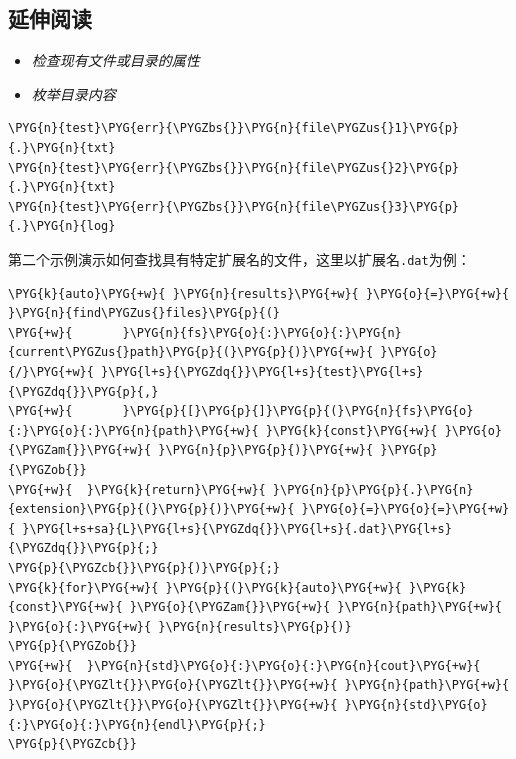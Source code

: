 
\subsection{延伸阅读}



\begin{itemize}
\item \textit{检查现有文件或目录的属性}



\item \textit{枚举目录内容}

\end{itemize}


\begin{codeblockbg}
\begin{Verbatim}[commandchars=\\\{\},breaklines=true,breakanywhere=true,fontsize=\codefont,xleftmargin=17bp]
\PYG{n}{test}\PYG{err}{\PYGZbs{}}\PYG{n}{file\PYGZus{}1}\PYG{p}{.}\PYG{n}{txt}
\PYG{n}{test}\PYG{err}{\PYGZbs{}}\PYG{n}{file\PYGZus{}2}\PYG{p}{.}\PYG{n}{txt}
\PYG{n}{test}\PYG{err}{\PYGZbs{}}\PYG{n}{file\PYGZus{}3}\PYG{p}{.}\PYG{n}{log}
\end{Verbatim}
\end{codeblockbg}



第二个示例演示如何查找具有特定扩展名的文件，这里以扩展名\texttt{.\allowbreak{}dat}为例：



\begin{codeblockbg}
\begin{Verbatim}[commandchars=\\\{\},breaklines=true,breakanywhere=true,fontsize=\codefont,xleftmargin=17bp]
\PYG{k}{auto}\PYG{+w}{ }\PYG{n}{results}\PYG{+w}{ }\PYG{o}{=}\PYG{+w}{ }\PYG{n}{find\PYGZus{}files}\PYG{p}{(}
\PYG{+w}{       }\PYG{n}{fs}\PYG{o}{:}\PYG{o}{:}\PYG{n}{current\PYGZus{}path}\PYG{p}{(}\PYG{p}{)}\PYG{+w}{ }\PYG{o}{/}\PYG{+w}{ }\PYG{l+s}{\PYGZdq{}}\PYG{l+s}{test}\PYG{l+s}{\PYGZdq{}}\PYG{p}{,}
\PYG{+w}{       }\PYG{p}{[}\PYG{p}{]}\PYG{p}{(}\PYG{n}{fs}\PYG{o}{:}\PYG{o}{:}\PYG{n}{path}\PYG{+w}{ }\PYG{k}{const}\PYG{+w}{ }\PYG{o}{\PYGZam{}}\PYG{+w}{ }\PYG{n}{p}\PYG{p}{)}\PYG{+w}{ }\PYG{p}{\PYGZob{}}
\PYG{+w}{  }\PYG{k}{return}\PYG{+w}{ }\PYG{n}{p}\PYG{p}{.}\PYG{n}{extension}\PYG{p}{(}\PYG{p}{)}\PYG{+w}{ }\PYG{o}{=}\PYG{o}{=}\PYG{+w}{ }\PYG{l+s+sa}{L}\PYG{l+s}{\PYGZdq{}}\PYG{l+s}{.dat}\PYG{l+s}{\PYGZdq{}}\PYG{p}{;}
\PYG{p}{\PYGZcb{}}\PYG{p}{)}\PYG{p}{;}
\PYG{k}{for}\PYG{+w}{ }\PYG{p}{(}\PYG{k}{auto}\PYG{+w}{ }\PYG{k}{const}\PYG{+w}{ }\PYG{o}{\PYGZam{}}\PYG{+w}{ }\PYG{n}{path}\PYG{+w}{ }\PYG{o}{:}\PYG{+w}{ }\PYG{n}{results}\PYG{p}{)}
\PYG{p}{\PYGZob{}}
\PYG{+w}{  }\PYG{n}{std}\PYG{o}{:}\PYG{o}{:}\PYG{n}{cout}\PYG{+w}{ }\PYG{o}{\PYGZlt{}}\PYG{o}{\PYGZlt{}}\PYG{+w}{ }\PYG{n}{path}\PYG{+w}{ }\PYG{o}{\PYGZlt{}}\PYG{o}{\PYGZlt{}}\PYG{+w}{ }\PYG{n}{std}\PYG{o}{:}\PYG{o}{:}\PYG{n}{endl}\PYG{p}{;}
\PYG{p}{\PYGZcb{}}
\end{Verbatim}
\end{codeblockbg}


